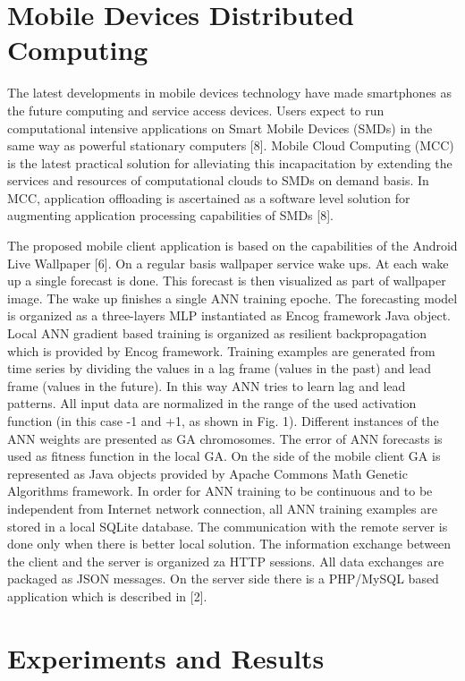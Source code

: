 \documentclass{llncs}
\begin{document}
\section{Mobile Devices Distributed Computing}
%
The latest developments in mobile devices technology have made smartphones as the future computing and service access devices. Users expect to run computational intensive applications on Smart Mobile Devices (SMDs) in the same way as powerful stationary computers [8]. Mobile Cloud Computing (MCC) is the latest practical solution for alleviating this incapacitation by extending the services and resources of computational clouds to SMDs on demand basis. In MCC, application offloading is ascertained as a software level solution for augmenting application processing capabilities of SMDs [8]. 

The proposed mobile client application is based on the capabilities of the Android Live Wallpaper [6]. On a regular basis wallpaper service wake ups. At each wake up a single forecast is done. This forecast is then visualized as part of wallpaper image. The wake up finishes a single ANN training epoche. The forecasting model is organized as a three-layers MLP instantiated as Encog framework Java object. Local ANN gradient based training is organized as resilient backpropagation which is provided by Encog framework. Training examples are generated from time series by dividing the values in a lag frame (values in the past) and lead frame (values in the future). In this way ANN tries to learn lag and lead patterns. All input data are normalized in the range of the used activation function (in this case -1 and +1, as shown in Fig. 1). Different instances of the ANN weights are presented as GA chromosomes. The error of ANN forecasts is used as fitness function in the local GA. On the side of the mobile client GA is represented as Java objects provided by Apache Commons Math Genetic Algorithms framework. In order for ANN training to be continuous and to be independent from Internet network connection, all ANN training examples are stored in a local SQLite database. The communication with the remote server is done only when there is better local solution. The information exchange between the client and the server is organized za HTTP sessions. All data exchanges are packaged as JSON messages. On the server side there is a PHP/MySQL based application which is described in [2]. 
%
\section{Experiments and Results}
%
%
\end{document}
